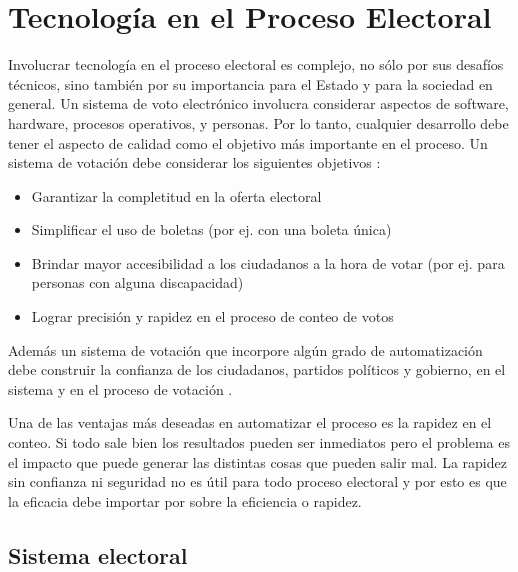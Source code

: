 \label{SistemaElectoral}
\chapter{Tecnología en el Proceso Electoral}

Involucrar tecnología en el proceso electoral es complejo, no sólo por sus desafíos técnicos, sino también por su importancia para el Estado y para la sociedad en general. Un sistema de voto electrónico involucra considerar aspectos de software, hardware, procesos operativos, y personas. Por lo tanto, cualquier desarrollo debe tener el aspecto de calidad como el objetivo más importante en el proceso.\newline
Un sistema de votación debe considerar los siguientes objetivos \cite{conicet}:
\begin{itemize}
    \item Garantizar la completitud en la oferta electoral
    \item Simplificar el uso de boletas (por ej. con una boleta única)
    \item Brindar mayor accesibilidad a los ciudadanos a la hora de votar (por ej. para personas con alguna discapacidad)
    \item Lograr precisión y rapidez en el proceso de conteo de votos
\end{itemize}
Además un sistema de votación que incorpore algún grado de automatización debe construir la confianza de los ciudadanos, partidos políticos y gobierno, en el sistema y en el proceso de votación \cite{conicet}.

Una de las ventajas más deseadas en automatizar el proceso es la rapidez en el conteo. Si todo sale bien los resultados pueden ser inmediatos pero el problema es el impacto que puede generar las distintas cosas que pueden salir mal. La rapidez sin confianza ni seguridad no es útil para todo proceso electoral y por esto es que la eficacia debe importar por sobre la eficiencia o rapidez.

\section{Sistema electoral}

